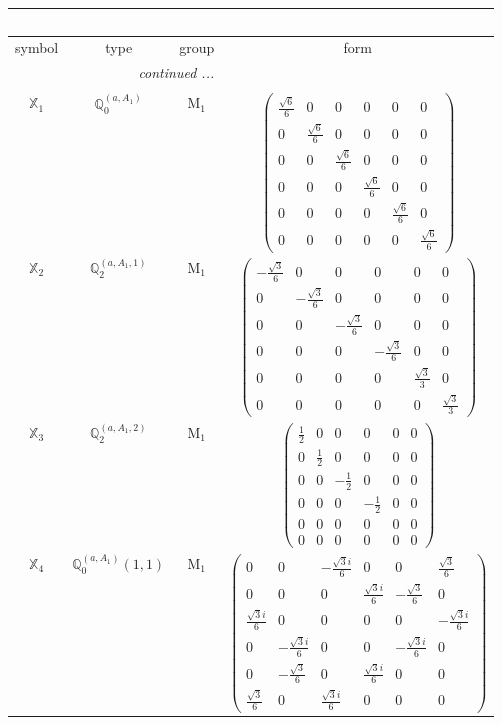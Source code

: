\documentclass[fleqn,10pt,landscape]{article}
\begin{document}
\begin{itemize}
\begin{center}
\begin{longtable}{c|c|c|c}
\multicolumn{3}{l}{\tablename\ \thetable{}} \\
 \hline \hline
symbol & type & group & form \\ \hline \endhead

 \hline \hline
\multicolumn{3}{r}{\footnotesize\it continued ...} \\ \endfoot

 \hline \hline
\multicolumn{3}{r}{} \\ \endlastfoot

$ \mathbb{X}_{1} $ & $\mathbb{Q}_{0}^{(a,A_{1})}$ & M$_{1}$ & $\begin{pmatrix} \frac{\sqrt{6}}{6} & 0 & 0 & 0 & 0 & 0 \\ 0 & \frac{\sqrt{6}}{6} & 0 & 0 & 0 & 0 \\ 0 & 0 & \frac{\sqrt{6}}{6} & 0 & 0 & 0 \\ 0 & 0 & 0 & \frac{\sqrt{6}}{6} & 0 & 0 \\ 0 & 0 & 0 & 0 & \frac{\sqrt{6}}{6} & 0 \\ 0 & 0 & 0 & 0 & 0 & \frac{\sqrt{6}}{6} \end{pmatrix}$ \\
$ \mathbb{X}_{2} $ & $\mathbb{Q}_{2}^{(a,A_{1},1)}$ & M$_{1}$ & $\begin{pmatrix} - \frac{\sqrt{3}}{6} & 0 & 0 & 0 & 0 & 0 \\ 0 & - \frac{\sqrt{3}}{6} & 0 & 0 & 0 & 0 \\ 0 & 0 & - \frac{\sqrt{3}}{6} & 0 & 0 & 0 \\ 0 & 0 & 0 & - \frac{\sqrt{3}}{6} & 0 & 0 \\ 0 & 0 & 0 & 0 & \frac{\sqrt{3}}{3} & 0 \\ 0 & 0 & 0 & 0 & 0 & \frac{\sqrt{3}}{3} \end{pmatrix}$ \\
$ \mathbb{X}_{3} $ & $\mathbb{Q}_{2}^{(a,A_{1},2)}$ & M$_{1}$ & $\begin{pmatrix} \frac{1}{2} & 0 & 0 & 0 & 0 & 0 \\ 0 & \frac{1}{2} & 0 & 0 & 0 & 0 \\ 0 & 0 & - \frac{1}{2} & 0 & 0 & 0 \\ 0 & 0 & 0 & - \frac{1}{2} & 0 & 0 \\ 0 & 0 & 0 & 0 & 0 & 0 \\ 0 & 0 & 0 & 0 & 0 & 0 \end{pmatrix}$ \\
$ \mathbb{X}_{4} $ & $\mathbb{Q}_{0}^{(a,A_{1})}(1,1)$ & M$_{1}$ & $\begin{pmatrix} 0 & 0 & - \frac{\sqrt{3} i}{6} & 0 & 0 & \frac{\sqrt{3}}{6} \\ 0 & 0 & 0 & \frac{\sqrt{3} i}{6} & - \frac{\sqrt{3}}{6} & 0 \\ \frac{\sqrt{3} i}{6} & 0 & 0 & 0 & 0 & - \frac{\sqrt{3} i}{6} \\ 0 & - \frac{\sqrt{3} i}{6} & 0 & 0 & - \frac{\sqrt{3} i}{6} & 0 \\ 0 & - \frac{\sqrt{3}}{6} & 0 & \frac{\sqrt{3} i}{6} & 0 & 0 \\ \frac{\sqrt{3}}{6} & 0 & \frac{\sqrt{3} i}{6} & 0 & 0 & 0 \end{pmatrix}$ \\

\end{longtable}
\end{center}
\end{itemize}
\end{document}
